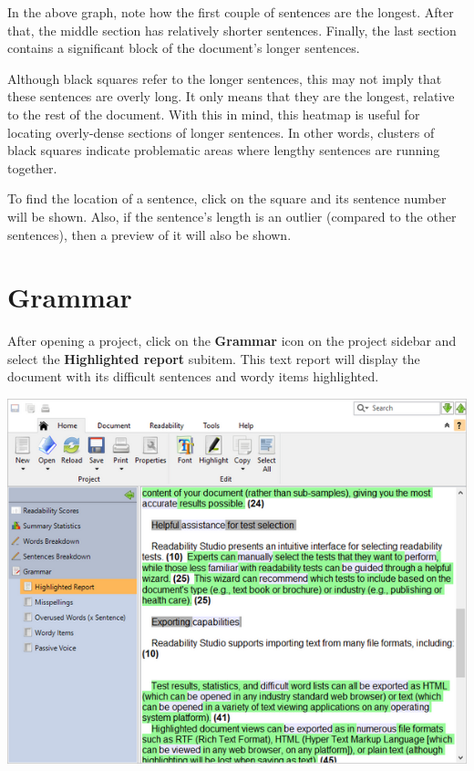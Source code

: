 \documentclass[
]{book}
\theoremstyle{definition}
\theoremstyle{definition}
\theoremstyle{definition}
\theoremstyle{definition}
\theoremstyle{remark}
\begin{document}
In the above graph, note how the first couple of sentences are the longest. After that, the middle section has relatively shorter sentences. Finally, the last section contains a significant block of the document's longer sentences.

Although black squares refer to the longer sentences, this may not imply that these sentences are overly long. It only means that they are the longest, relative to the rest of the document. With this in mind, this heatmap is useful for locating overly-dense sections of longer sentences. In other words, clusters of black squares indicate problematic areas where lengthy sentences are running together.

To find the location of a sentence, click on the square and its sentence number will be shown. Also, if the sentence's length is an outlier (compared to the other sentences), then a preview of it will also be shown.

\hypertarget{reviewing-standard-grammar}{%
\section{Grammar}\label{reviewing-standard-grammar}}

After opening a project, click on the \textbf{Grammar} icon on the project sidebar and select the \textbf{Highlighted report} subitem. This text report will display the document with its difficult sentences and wordy items highlighted.

\includegraphics{Images/featuressentences.png}
\end{document}
